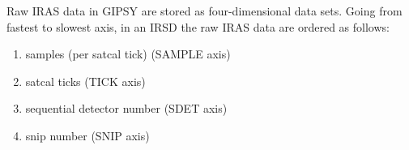 Raw IRAS data in GIPSY are stored as four-dimensional data sets.  Going
from fastest to slowest axis, in an IRSD the raw IRAS data are ordered
as follows:

\begin{enumerate}

\item samples (per satcal tick) (SAMPLE axis)

\item satcal ticks (TICK axis)

\item sequential detector number (SDET axis)

\item snip number (SNIP axis)

\end{enumerate}

\clearpage


